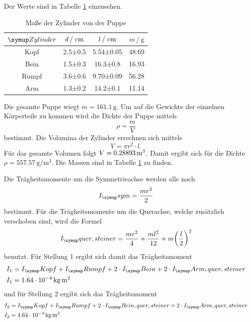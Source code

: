 Der Werte sind in Tabelle \ref{tab:wertepuppe} einzusehen.
\begin{table}
  \centering
  \begin{tabular}{c c c c}
    \toprule
    $\su{Zylinder}$ & $d \,/\,\,\si{\centi\meter}$ & $l\,/\,\,\si{\centi\meter}$ & $ m\,/\,\si{\gram}$ \\
    \midrule
    Kopf & 2.5±0.5 & 5.54±0.05 & 48.69 \\
    Bein & 1.5±0.3 & 16.3±0.8 & 16.93 \\
    Rumpf & 3.6±0.6 & 9.70±0.09 & 56.28 \\
    Arm & 1.3±0.2 & 14.2±0.1 & 11.14 \\
    \bottomrule
  \end{tabular}
  \caption{Maße der Zylinder von der Puppe}
  \label{tab:wertepuppe}
\end{table}
Die gesamte Puppe wiegt $m = 161.1\,\si{\gram}$. Um auf die Gewichte der einzelnen
Körperteile zu kommen wird die Dichte der Puppe mittels
\begin{equation}
  \rho = \frac{m}{V}
\end{equation}
bestimmt. Die Volumina der Zylinder errechnen sich mittels
\begin{equation}
  V = \pi r^2 \cdot l.
\end{equation}
Für das gesamte Volumen folgt $V = 0.28893 \,\si{\cubic\meter}$. Damit ergibt sich für die
Dichte $ \rho = 557.57 \,\si{\gram\per\cubic\meter}$. Die Massen sind
in Tabelle \ref{tab:wertepuppe} zu finden.

Die Trägheitsmomente um die Symmetrieachse werden alle nach
\begin{equation}
  I_\su{sym} = \frac{mr^2}{2}
\end{equation}
bestimmt.
Für die Trägheitsmomente um die Querachse, welche zusätzlich verschoben sind,
wird die Formel
\begin{equation}
  I_\su{quer,steiner} = \frac{mr^2}{4} + \frac{ml^2}{12} + m \biggl(\frac{l}{2}\biggr)^2
\end{equation}
benutzt.
Für Stellung 1 ergibt sich damit das Trägheitsmoment
\begin{align}
  I_1 &= I_\su{Kopf} + I_\su{Rumpf} + 2 \cdot I_\su{Bein} + 2 \cdot I_\su{Arm,quer,steiner} \\
  I_1 &= 1.64 \cdot 10^{-4} \,\si{\kilo\gram\square\meter}
\end{align}
und für Stellung 2 ergibt sich das Trägheitsmoment
\begin{align}
  I_2 &= I_\su{Kopf} + I_\su{Rumpf} + 2 \cdot I_\su{Bein,quer,steiner} + 2 \cdot I_\su{Arm,quer,steiner} \\
  I_2 &= 4.64 \cdot 10^{-4} \,\si{\kilo\gram\square\meter}.
\end{align}
